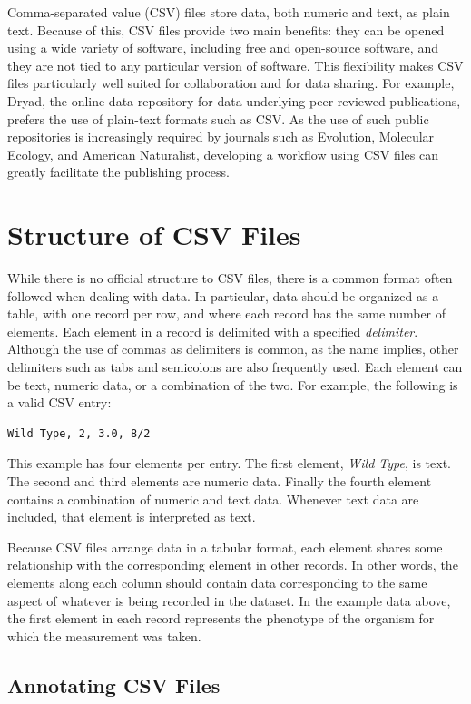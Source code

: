 Comma-separated value (CSV) files store data, both numeric and text, as
plain text. Because of this, CSV files provide two main benefits: they
can be opened using a wide variety of software, including free and
open-source software, and they are not tied to any particular version of
software. This flexibility makes CSV files particularly well suited for
collaboration and for data sharing. For example, Dryad, the online data
repository for data underlying peer-reviewed publications, prefers the
use of plain-text formats such as CSV. As the use of such public
repositories is increasingly required by journals such as Evolution,
Molecular Ecology, and American Naturalist, developing a workflow using
CSV files can greatly facilitate the publishing process.

\section{Structure of CSV Files}

While there is no official structure to CSV files, there is a common
format often followed when dealing with data. In particular, data should
be organized as a table, with one record per row, and where each record
has the same number of elements. Each element in a record is delimited
with a specified \emph{delimiter}. Although the use of commas as
delimiters is common, as the name implies, other delimiters such as tabs
and semicolons are also frequently used. Each element can be text,
numeric data, or a combination of the two. For example, the following is
a valid CSV entry:

\begin{lstlisting}
Wild Type, 2, 3.0, 8/2
\end{lstlisting}
This example has four elements per entry. The first element, \emph{Wild
Type}, is text. The second and third elements are numeric data. Finally
the fourth element contains a combination of numeric and text data.
Whenever text data are included, that element is interpreted as text.

Because CSV files arrange data in a tabular format, each element shares
some relationship with the corresponding element in other records. In
other words, the elements along each column should contain data
corresponding to the same aspect of whatever is being recorded in the
dataset. In the example data above, the first element in each record
represents the phenotype of the organism for which the measurement was
taken.

\subsection{Annotating CSV Files}

